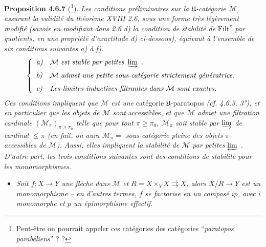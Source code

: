 \documentclass[11pt]{article}
\newcommand{\msp}[1]{\marginpar{\footnotesize [#1]}}
\newcommand{\Mc}{\mathcal{M}}
\newcommand{\U}{\mathfrak{U}}
\begin{document}
\textbf{Proposition 4.6.7} (\footnote[62]{Peut-être on pourrait appeler ces catégories des catégories “\textit{paratopos parabéliens}” ? ?}). \textit{Les conditions préliminaires sur la $\U$-catégorie $\Mc$, assurant la validité du théorème XVIII 2.6, sous une forme très légèrement modifié (savoir en modifiant dans 2.6 d) la condition de stabilité de} $\mathrm{Filt}^{\pi}$ \textit{par quotients, en une propriété d'exactitude d) ci-dessous), équivaut à l'ensemble de six conditions suivantes a) à f).} %
\[
\left\{
\begin{array}{ll}
\textit{a)} & \Mc\ \textit{est stable par petites}\ \varinjlim\ . \\[1.5ex]
\textit{b)} & \Mc\ \textit{admet une petite sous-catégorie strictement génératrice.} \\[1.5ex]
\textit{c)} & \textit{Les limites inductives filtrantes dans}\ \Mc\ \textit{sont exactes.}
\end{array}
\right.
\]
\textit{Ces conditions impliquent que $\Mc$ est une} catégorie $\U$-paratopos \textit{(cf. 4.6.3, 3°), et en particulier que les objets de $\Mc$ sont} accessibles, \textit{et que $\Mc$ admet une filtration cardinale $(\Mc_{\pi})_{\pi \geqslant \pi_0}$ telle que pour tout $\pi \geqslant \pi_0$, $\Mc_{\pi}$ soit stable par $\varinjlim$ de cardinal $\leqslant \pi$ (en fait, on aura $\Mc_{\pi} =$ sous-catégorie pleine des objets $\pi$-accessibles de $\Mc$). Aussi, elles impliquent la stabilité de $\Mc$ par petites $\varprojlim$ . D'autre part, les trois conditions suivantes sont des conditions de stabilité pour les monomorphismes.}
\begin{itemize}[leftmargin=4em]
\item[\textit{d)}] \textit{Soit $f : X \longrightarrow Y$ une flèche dans $\Mc$ et $R = X \times_Y X \rightrightarrows X$, alors $X/R \longrightarrow Y$ est un monomorphisme -- en d'autres termes, $f$ se factorise en un composé $ip$, avec $i$ monomorphe et $p$ un épimorphisme effectif.}
\end{itemize}

\msp{page 158}
\end{document}
